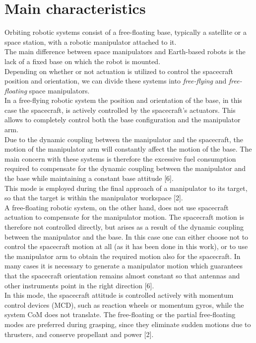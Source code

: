 \documentclass[a4paper,12pt,oneside]{report}
\begin{document}
\section{Main characteristics}
Orbiting robotic systems consist of a free-floating base, typically a satellite or a space station, with a robotic manipulator attached to it.\\
The main difference between space manipulators and Earth-based robots is the lack of a fixed base on which the robot is mounted.\\
Depending on whether or not actuation is utilized to control the spacecraft position and orientation, we can divide these systems into \textit{free-flying} and \textit{free-floating} space manipulators. \\
In a free-flying robotic system the position and orientation of the base, in this case the spacecraft, is actively controlled by the spacecraft’s actuators. This allows to completely control both the base configuration and the manipulator arm.\\ 
Due to the dynamic coupling between the manipulator and the spacecraft, the motion of the manipulator arm will constantly affect the motion of the base. The main concern with these systems is therefore the excessive fuel consumption required to compensate for the dynamic coupling between the manipulator and the base while maintaining a constant base attitude [6].\\
This mode is employed during the final approach of a manipulator to its target, so that the target is within the manipulator workspace [2].\\
A free-floating robotic system, on the other hand, does not use spacecraft actuation to compensate for the manipulator motion. The spacecraft motion is therefore not controlled directly, but arises as a result of the dynamic coupling between the manipulator and the base. In this case one can either choose not to control the spacecraft motion at all (as it has been done in this work), or to use the manipulator arm to obtain the required motion also for the spacecraft. In many cases it is necessary to generate a manipulator motion which guarantees that the spacecraft orientation remains almost constant so that antennas and other instruments point in the right direction [6].\\
In this mode, the spacecraft attitude is controlled actively with momentum control devices (MCD), such as reaction wheels or momentum gyros, while the system CoM does not translate. The free-floating or the partial free-floating modes are preferred during grasping, since they eliminate sudden motions due to thrusters, and conserve propellant and power [2].\\
\end{document}

